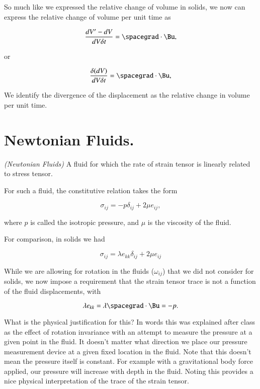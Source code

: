 So much like we expressed the relative change of volume in solids, we now can express the relative change of volume per unit time as

\begin{equation}\label{eqn:continuumL9:190}
\frac{dV' - dV}{dV \delta t} = \spacegrad \cdot \Bu,
\end{equation}

or

\begin{equation}\label{eqn:continuumL9:210}
\frac{\delta(dV)}{dV \delta t} = \spacegrad \cdot \Bu,
\end{equation}

We identify the divergence of the displacement as the relative change in volume per unit time.

\section{Newtonian Fluids.}

\begin{definition}
\emph{(Newtonian Fluids)}
\label{dfn:continuumL9:230}
A fluid for which the rate of strain tensor is linearly related to stress tensor.
\end{definition}

For such a fluid, the constitutive relation takes the form

\begin{equation}\label{eqn:continuumL9:250}
\boxed{
\sigma_{ij} = - p \delta_{ij} + 2 \mu e_{ij},
}
\end{equation}

where $p$ is called the isotropic pressure, and $\mu$ is the viscosity of the fluid.

For comparison, in solids we had

\begin{equation}\label{eqn:continuumL9:270}
\sigma_{ij} = \lambda e_{kk} \delta_{ij} + 2 \mu e_{ij}
\end{equation}

While we are allowing for rotation in the fluids ($\omega_{ij}$) that we did not consider for solids, we now impose a requirement that the strain tensor trace is not a function of the fluid displacements, with

\begin{equation}\label{eqn:continuumL9:630}
\lambda e_{kk} = \lambda \spacegrad \cdot \Bu = -p.
\end{equation}

What is the physical justification for this?  In words this was explained after class as the effect of rotation invariance with an attempt to measure the pressure at a given point in the fluid.  It doesn't matter what direction we place our pressure measurement device at a given fixed location in the fluid.  Note that this doesn't mean the pressure itself is constant.  For example with a gravitational body force applied, our pressure will increase with depth in the fluid.  Noting this provides a nice physical interpretation of the trace of the strain tensor.

